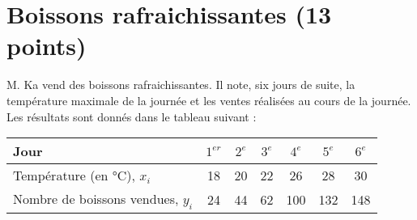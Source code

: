 \section{Boissons rafraichissantes (13 points)}

M. Ka vend des boissons rafraichissantes. Il note, six jours de suite, la température maximale de la journée et les ventes réalisées au cours de la journée.
Les résultats sont donnés dans le tableau suivant :

\vspace*{0.5cm}
\begin{center}
	
\begin{tabular}{|@{\ }l@{\ }|@{\ }c@{\ }|@{\ }c@{\ }|@{\ }c@{\ }|@{\ }c@{\ }|@{\ }c@{\ }|@{\ }c@{\ }|}
	\hline
	Jour                              & $1^{er}$ & $2^e$ & $3^e$ & $4^e$ & $5^e$ & $6^e$ \\ \hline
	Température (en °C), $x_i$        & 18       & 20    & 22    & 26    & 28    & 30    \\ \hline
	Nombre de boissons vendues, $y_i$ & 24       & 44    & 62    & 100   & 132   & 148   \\ \hline
\end{tabular}

\end{center}

